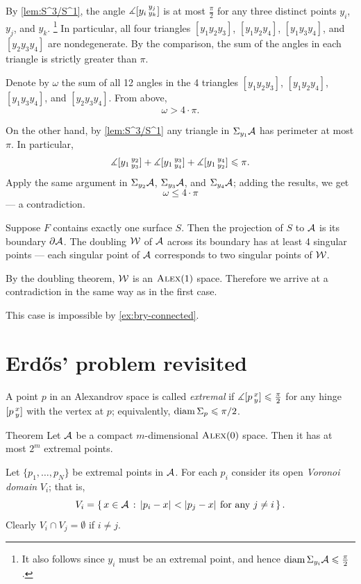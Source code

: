 By \ref{lem:S^3/S^1}, the angle $\measuredangle[y_i\,{}^{y_j}_{y_k}]$ is at most $\tfrac\pi2$
for any three distinct points $y_i$, $y_j$, and $y_k$.%
\footnote{It also follows since $y_i$ must be an extremal point, and hence $\operatorname{\rm diam}\nolimits\Sigma_{y_i}\mathcal{A}\leqslant\tfrac\pi2$.}
In particular, all four triangles $[y_1y_2y_3]$, $[y_1y_2y_4]$, $[y_1y_3y_4]$, and $[y_2y_3y_4]$ are nondegenerate.
By the comparison, the sum of the angles in each triangle is strictly greater than $\pi$.

Denote by $\omega$ the sum of all 12 angles in the 4 triangles $[y_1y_2y_3]$, $[y_1y_2y_4]$, $[y_1y_3y_4]$, and $[y_2y_3y_4]$.
From above,
\[\omega>4\cdot\pi.\]

On the other hand, by \ref{lem:S^3/S^1} any triangle in $\Sigma_{y_1}\mathcal{A}$ has perimeter at most $\pi$.
In particular, 
\[\measuredangle[y_1\,{}^{y_2}_{y_3}]+\measuredangle[y_1\,{}^{y_3}_{y_4}]+\measuredangle[y_1\,{}^{y_4}_{y_2}]\leqslant \pi.\]
Apply the same argument in $\Sigma_{y_2}\mathcal{A}$, $\Sigma_{y_3}\mathcal{A}$, and $\Sigma_{y_4}\mathcal{A}$;
adding the results, we get 
\[\omega\le 4\cdot\pi\]
--- a contradiction.


Suppose $F$ contains exactly one surface $S$.
Then the projection of $S$ to $\mathcal{A}$ is its boundary $\partial \mathcal{A}$.
The doubling $\mathcal{W}$ of $\mathcal{A}$ across its boundary has at least 4 singular points --- each singular point of $\mathcal{A}$ corresponds to two singular points of $\mathcal{W}$.

By the doubling theorem, $\mathcal{W}$ is an $\textup{\textsc{Alex}}(1)$ space.
Therefore we arrive at a contradiction in the same way as in the first case.

 This case is impossible by \ref{ex:bry-connected}.
\qeds

\section{Erdős' problem revisited}

A point $p$ in an Alexandrov space is called \emph{extremal} if $\measuredangle[p\,{}^{x}_{y}]\leqslant \tfrac\pi2$ for any hinge $[p\,{}^{x}_{y}]$ with the vertex at $p$; equivalently, $\operatorname{\rm diam}\nolimits \Sigma_p\leqslant \pi/2$.

\begin{thm}{Theorem}\label{thm:extr-point}
Let $\mathcal{A}$ be a compact $m$-dimensional $\textup{\textsc{Alex}}(0)$ space.
Then it has at most $2^m$ extremal points.
\end{thm}

Let $\{p_1,\dots,p_N\}$ be extremal points in $\mathcal{A}$.
For each $p_i$ consider its open \emph{Voronoi domain} $V_i$; that is, 
\[V_i=\set{x\in \spc{A}}{\dist{p_i}{x}{}<\dist{p_j}{x}{}\ \text{for any}\ j\ne i}.\]
Clearly $V_i\cap V_j=\emptyset$ if $i\not=j$.

